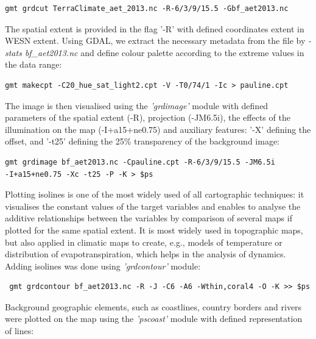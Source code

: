 \documentclass[knowledge,article,submit,pdftex,moreauthors]{Definitions/mdpi}
\begin{document}
\begin{small}
\begin{verbatim}
gmt grdcut TerraClimate_aet_2013.nc -R-6/3/9/15.5 -Gbf_aet2013.nc
\end{verbatim} 
\end{small}

The spatial extent is provided in the flag '-R' with defined coordinates extent in WESN extent. Using GDAL, we extract the necessary metadata from the file by \emph{-stats bf\_aet2013.nc} and define colour palette according to the extreme values in the data range: 

\begin{small}
\begin{verbatim}
gmt makecpt -C20_hue_sat_light2.cpt -V -T0/74/1 -Ic > pauline.cpt
\end{verbatim} 
\end{small}

The image is then visualised using the \emph{'grdimage'} module with defined parameters of the spatial extent (-R), projection (-JM6.5i), the effects of the illumination on the map (-I+a15+ne0.75) and auxiliary features: '-X' defining the offset, and  '-t25' defining the 25\% transparency of the background image:

\begin{small}
\begin{verbatim}
gmt grdimage bf_aet2013.nc -Cpauline.cpt -R-6/3/9/15.5 -JM6.5i 
-I+a15+ne0.75 -Xc -t25 -P -K > $ps
\end{verbatim} 
\end{small}

 Plotting isolines is one of the most widely used of all cartographic techniques: it visualises the constant values of the target variables and enables to analyse the additive relationships between the variables by comparison of several maps if plotted for the same spatial extent. It is most widely used in topographic maps, but also applied in climatic maps to create, e.g., models of temperature or distribution of evapotranspiration, which helps in the analysis of dynamics. Adding isolines was done using \emph{'grdcontour'} module: 
 
 \begin{small}
 \begin{verbatim}
 gmt grdcontour bf_aet2013.nc -R -J -C6 -A6 -Wthin,coral4 -O -K >> $ps
 \end{verbatim} 
 \end{small}
 
 Background geographic elements, such as coastlines, country borders and rivers were plotted on the map using the \emph{'pscoast'} module with defined representation of lines: 
 
\end{document}
